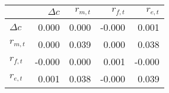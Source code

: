\begin{tabular}{lrrrr}
\toprule
 & $\Delta c$ & $r_{m,t}$ & $r_{f,t}$ & $r_{e,t}$ \\
\midrule
$\Delta c$ & 0.000 & 0.000 & -0.000 & 0.001 \\
$r_{m,t}$ & 0.000 & 0.039 & 0.000 & 0.038 \\
$r_{f,t}$ & -0.000 & 0.000 & 0.001 & -0.000 \\
$r_{e,t}$ & 0.001 & 0.038 & -0.000 & 0.039 \\
\bottomrule
\end{tabular}
